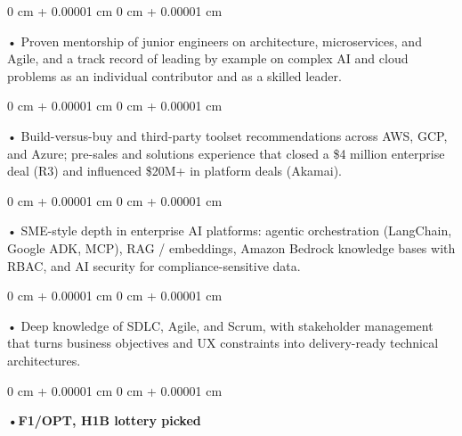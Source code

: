 \documentclass[10pt, letterpaper]{article}
\newenvironment{onecolentry}{
    \begin{adjustwidth}{
        0 cm + 0.00001 cm
    }{
        0 cm + 0.00001 cm
    }
}{
    \end{adjustwidth}
} %
\begin{document}
        \begin{onecolentry}
            • Proven mentorship of junior engineers on architecture, microservices, and Agile, and a track record of leading by example on complex AI and cloud problems as an individual contributor and as a skilled leader.
        \end{onecolentry}
        \begin{onecolentry}
            • Build-versus-buy and third-party toolset recommendations across AWS, GCP, and Azure; pre-sales and solutions experience that closed a \$4 million enterprise deal (R3) and influenced \$20M+ in platform deals (Akamai).
        \end{onecolentry}
        \begin{onecolentry}
            • SME-style depth in enterprise AI platforms: agentic orchestration (LangChain, Google ADK, MCP), RAG / embeddings, Amazon Bedrock knowledge bases with RBAC, and AI security for compliance-sensitive data.
        \end{onecolentry}
        \begin{onecolentry}
            • Deep knowledge of SDLC, Agile, and Scrum, with stakeholder management that turns business objectives and UX constraints into delivery-ready technical architectures.
        \end{onecolentry}

        \begin{onecolentry}
                \textbf{•F1/OPT, H1B lottery picked}
        \end{onecolentry}

    \vspace{2 pt }
\end{document}
